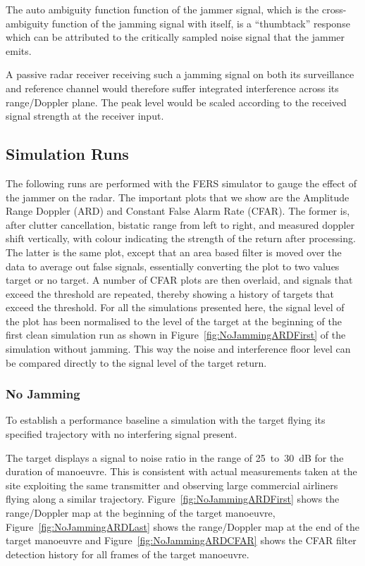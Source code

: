 \documentclass[conference]{IEEEtran}
\begin{document}
The auto ambiguity function function of the jammer signal, which is the cross-ambiguity function of the jamming signal with itself, is a ``thumbtack'' response which can be attributed to the critically sampled noise signal that the jammer emits. 

A passive radar receiver receiving such a jamming signal on both its surveillance and reference channel would therefore suffer integrated interference across its range/Doppler plane. The peak level would be scaled according to the received signal strength at the receiver input.

\subsection{Simulation Runs}\label{sec:ECMSims}


The following runs are performed with the FERS simulator to gauge the effect of the jammer on the radar. The important plots that we show are the Amplitude Range Doppler (ARD) and Constant False Alarm Rate (CFAR). The former is, after clutter cancellation, bistatic range from left to right, and measured doppler shift vertically, with colour indicating the strength of the return after processing. The latter is the same plot, except that an area based filter is moved over the data to average out false signals, essentially converting the plot to two values target or no target. A number of CFAR plots are then overlaid, and signals that exceed the threshold are repeated, thereby showing a history of targets that exceed the threshold. For all the simulations presented here, the signal level of the plot has been normalised to the level of the target at the beginning of the first clean simulation run as shown in Figure~\ref{fig:NoJammingARDFirst} of the simulation without jamming. This way the noise and interference floor level can be compared directly to the signal level of the target return.

\subsubsection{No Jamming}
To establish a performance baseline a simulation with the target flying its specified trajectory with no interfering signal present.

The target displays a signal to noise ratio in the range of 25~to~30~dB for the duration of manoeuvre. This is consistent with actual measurements taken at the site exploiting the same transmitter and observing large commercial airliners flying along a similar trajectory. Figure~\ref{fig:NoJammingARDFirst} shows the range/Doppler map at the beginning of the target manoeuvre, Figure~\ref{fig:NoJammingARDLast} shows the range/Doppler map at the end of the target manoeuvre and Figure~\ref{fig:NoJammingARDCFAR} shows the CFAR filter detection history for all frames of the target manoeuvre.
\end{document}

